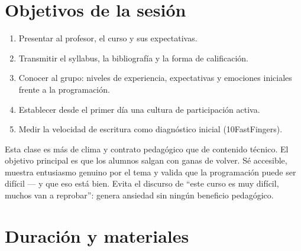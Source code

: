 \documentclass[12pt, oneside]{article}
\begin{document}

\tableofcontents
\newpage

\section{Objetivos de la sesión}

\begin{enumerate}
  \item Presentar al profesor, el curso y sus expectativas.
  \item Transmitir el syllabus, la bibliografía y la forma de calificación.
  \item Conocer al grupo: niveles de experiencia, expectativas y emociones
        iniciales frente a la programación.
  \item Establecer desde el primer día una cultura de participación activa.
  \item Medir la velocidad de escritura como diagnóstico inicial (10FastFingers).
\end{enumerate}

\begin{notaprofesor}
  Esta clase es más de clima y contrato pedagógico que de contenido técnico.
  El objetivo principal es que los alumnos salgan con ganas de volver.
  Sé accesible, muestra entusiasmo genuino por el tema y valida que la
  programación puede ser difícil — y que eso está bien. Evita el discurso
  de ``este curso es muy difícil, muchos van a reprobar'': genera ansiedad
  sin ningún beneficio pedagógico.
\end{notaprofesor}

\section{Duración y materiales}
\end{document}
